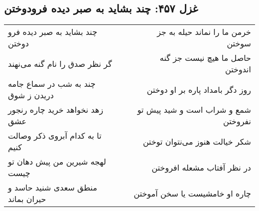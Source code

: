 \begin{center}
\section*{غزل ۴۵۷: چند بشاید به صبر دیده فرودوختن}
\label{sec:457}
\begin{longtable}{l p{0.5cm} r}
چند بشاید به صبر دیده فرو دوختن
&&
خرمن ما را نماند حیله به جز سوختن
\\
گر نظر صدق را نام گنه می‌نهند
&&
حاصل ما هیچ نیست جز گنه اندوختن
\\
چند به شب در سماع جامه دریدن ز شوق
&&
روز دگر بامداد پاره بر او دوختن
\\
زهد نخواهد خرید چاره رنجور عشق
&&
شمع و شراب است و شید پیش تو نفروختن
\\
تا به کدام آبروی ذکر وصالت کنیم
&&
شکر خیالت هنوز می‌نتوان توختن
\\
لهجه شیرین من پیش دهان تو چیست
&&
در نظر آفتاب مشعله افروختن
\\
منطق سعدی شنید حاسد و حیران بماند
&&
چاره او خامشیست یا سخن آموختن
\\
\end{longtable}
\end{center}
